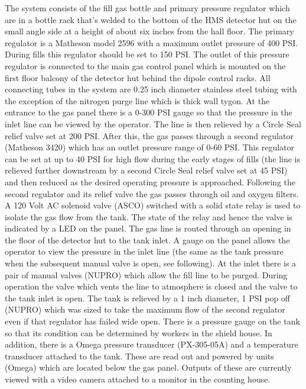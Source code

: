 The system consists of the fill gas bottle and primary
pressure regulator which are in a bottle rack that's welded to
the bottom of the HMS detector hut on the small angle side at a height
of about six inches from the hall floor. The primary regulator is
a Matheson model 2596 with a maximum outlet pressure of 400 PSI.
During fills this regulator should be set to 150 PSI.
The outlet of this pressure regulator is connected to the
main gas control panel which is mounted on the first floor balcony
of the detector hut behind the dipole control racks. All connecting
tubes in the system are 0.25 inch diameter stainless steel tubing with
the exception of the nitrogen purge line which is thick wall tygon.
At the entrance to the gas panel there is a 0-300 PSI gauge so that
the pressure in the inlet line can be viewed by the operator.
The line is then relieved by a Circle Seal relief valve set at 200 PSI.
After this, the gas passes through a second regulator (Matheson 3420)
which has an
outlet pressure range of 0-60 PSI. This regulator can be set at
up to 40 PSI for high flow during the early stages of fills
(the line is relieved further downstream by a second
Circle Seal relief valve set at 45 PSI) and then reduced as
the desired operating pressure is approached. Following the second regulator
and its relief valve the gas passes through oil and oxygen filters.
A 120 Volt AC solenoid valve (ASCO) switched with a solid state
relay is used to isolate the gas flow from the tank. The state of
the relay and hence the valve is indicated by a LED on the panel.
The gas line is routed through an opening in the floor of the detector hut
to the tank inlet. A gauge on the panel allows the operator to view
the pressure in the inlet line (the same as the tank pressure
when the subsequent manual valve is open, see following).
At the inlet there is a pair of manual valves (NUPRO)
which allow the fill line to be purged.
During operation the valve which vents the
line to atmosphere is closed and the valve to the tank inlet is open.
The tank is relieved by a 1 inch diameter, 1 PSI pop off (NUPRO) which was
sized to take the
maximum flow of the second regulator even if that regulator has failed
wide open. There is a pressure gauge on the tank so that its condition
can be determined by workers in the shield house. In addition,
there is a Omega pressure transducer (PX-305-05A) and a temperature
transducer attached to the tank. These are read out and powered by
units (Omega) which are located below the gas panel.  Outputs of these
are currently viewed with a video camera attached
to a monitor in the counting house.

